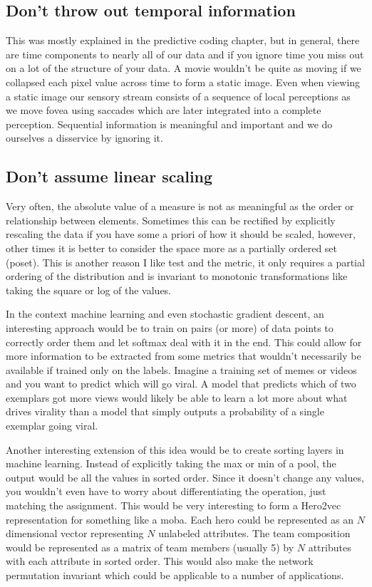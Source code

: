 \subsection{Don't throw out temporal information}
This was mostly explained in the predictive coding chapter, but in general, there are time components to nearly all of our data and if you ignore time you miss out on a lot of the structure of your data. A movie wouldn't be quite as moving if we collapsed each pixel value across time to form a static image. Even when viewing a static image our sensory stream consists of a sequence of local perceptions as we move fovea using saccades which are later integrated into a complete perception. Sequential information is meaningful and important and we do ourselves a disservice by ignoring it.

\subsection{Don't assume linear scaling}
Very often, the absolute value of a measure is not as meaningful as the order or relationship between elements. Sometimes this can be rectified by explicitly rescaling the data if you have some a priori of how it should be scaled, however, other times it is better to consider the space more as a partially ordered set (poset). This is another reason I like \KS test and the \KS metric, it only requires a partial ordering of the distribution and is invariant to monotonic transformations like taking the square or log of the values.

In the context machine learning and even stochastic gradient descent, an interesting approach would be to train on pairs (or more) of data points to correctly order them and let softmax deal with it in the end. This could allow for more information to be extracted from some metrics that wouldn't necessarily be available if trained only on the labels. Imagine a training set of memes or videos and you want to predict which will go viral. A model that predicts which of two exemplars got more views would likely be able to learn a lot more about what drives virality than a model that simply outputs a probability of a single exemplar going viral.

Another interesting extension of this idea would be to create sorting layers in machine learning. Instead of explicitly taking the max or min of a pool, the output would be all the values in sorted order. Since it doesn't change any values, you wouldn't even have to worry about differentiating the operation, just matching the assignment. This would be very interesting to form a Hero2vec representation for something like a moba. Each hero could be represented as an $N$ dimensional vector representing $N$ unlabeled attributes. The team composition would be represented as a matrix of team members (usually 5) by $N$ attributes with each attribute in sorted order. This would also make the network permutation invariant which could be applicable to a number of applications.

